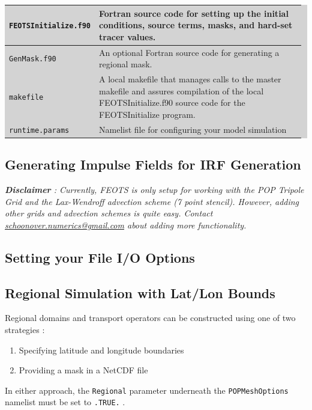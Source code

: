 \documentclass{softwaremanual}
\begin{document}
 \vspace{0.5cm}
 \begin{flushleft}
\begingroup\setlength{\fboxsep}{0pt}
  \colorbox{lightgray}{
    \begin{tabular}{p{0.25\linewidth} | p{0.725\linewidth}}
    \toprule
    \texttt{FEOTSInitialize.f90} & Fortran source code for setting up the initial conditions, source terms, masks, and hard-set tracer values.\\
    \midrule
    \texttt{GenMask.f90} & An optional Fortran source code for generating a regional mask.\\
    \midrule
    \texttt{makefile} & A local makefile that manages calls to the master makefile and assures compilation of the local FEOTSInitialize.f90 source code for the FEOTSInitialize program. \\
    \midrule
    \texttt{runtime.params} & Namelist file for configuring your model simulation\\
    \bottomrule
\end{tabular}
}\endgroup
\end{flushleft}
\vspace{0.5cm}

\subsection{Generating Impulse Fields for IRF Generation}
\textit{\textbf{Disclaimer} : Currently, FEOTS is only setup for working with the POP Tripole Grid and the Lax-Wendroff advection scheme (7 point stencil). However, adding other grids and advection schemes is quite easy. Contact \href{mailto:schoonover.numerics@gmail.com}{schoonover.numerics@gmail.com} about adding more functionality.} \\

 

\subsection{Setting your File I/O Options}

\subsection{Regional Simulation with Lat/Lon Bounds}
Regional domains and transport operators can be constructed using one of two strategies :
\begin{enumerate}
\item Specifying latitude and longitude boundaries
\item Providing a mask in a NetCDF file
\end{enumerate} 
In either approach, the \texttt{Regional} parameter underneath the \texttt{POPMeshOptions} namelist must be set to \texttt{.TRUE.} .
\end{document}
